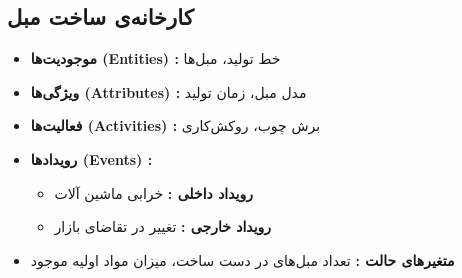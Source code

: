 \subsection*{کارخانه‌ی ساخت مبل}
\begin{itemize}
	\item \textbf{موجودیت‌ها (Entities) :} خط تولید، مبل‌ها
	\item \textbf{ویژگی‌ها (Attributes) :} مدل مبل، زمان تولید
	\item \textbf{فعالیت‌ها (Activities) :} برش چوب، روکش‌کاری
	\item \textbf{رویدادها (Events) :}
	\begin{itemize}
		\item \textbf{رویداد داخلی  :} خرابی ماشین آلات
		\item \textbf{رویداد خارجی  :} تغییر در تقاضای بازار
	\end{itemize}
	\item \textbf{متغیرهای حالت  :} تعداد مبل‌های در دست ساخت، میزان مواد اولیه موجود
\end{itemize}